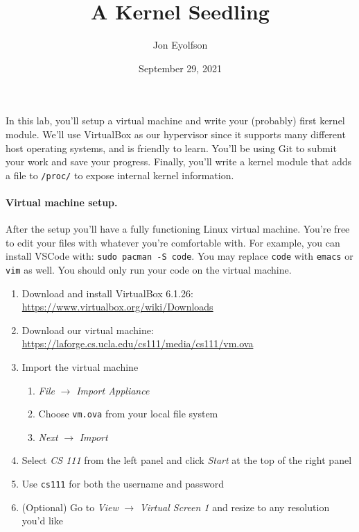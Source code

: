 

\title{A Kernel Seedling}
\author{Jon Eyolfson}
\date{September 29, 2021}



\maketitle

In this lab, you'll setup a virtual machine and write your (probably) first
kernel module.
We'll use VirtualBox as our hypervisor since it supports many different host
operating systems, and is friendly to learn.
You'll be using Git to submit your work and save your progress.
Finally, you'll write a kernel module that adds a file to \lstinline|/proc/|
to expose internal kernel information.

\paragraph{Virtual machine setup.}

After the setup you'll have a fully functioning Linux virtual machine.
You're free to edit your files with whatever you're comfortable with.
For example, you can install VSCode with: \texttt{sudo pacman -S code}.
You may replace \texttt{code} with \texttt{emacs} or \texttt{vim} as well.
You should only run your code on the virtual machine.

\begin{enumerate}
  \item Download and install VirtualBox 6.1.26:
        \url{https://www.virtualbox.org/wiki/Downloads}
  \item Download our virtual machine:
        \url{https://laforge.cs.ucla.edu/cs111/media/cs111/vm.ova}
  \item Import the virtual machine
    \begin{enumerate}
      \item \textit{File} $\rightarrow$ \textit{Import Appliance}
      \item Choose \lstinline|vm.ova| from your local file system
      \item \textit{Next} $\rightarrow$ \textit{Import}
    \end{enumerate}
  \item Select \textit{CS 111} from the left panel and click \textit{Start} at
        the top of the right panel
  \item Use \lstinline|cs111| for both the username and password
  \item (Optional) Go to \textit{View} $\rightarrow$ \textit{Virtual Screen 1}
        and resize to any resolution you'd like
\end{enumerate}

